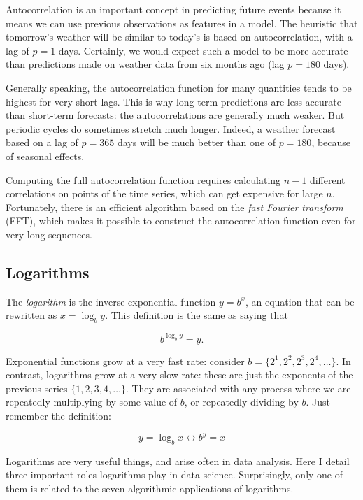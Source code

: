 \documentclass[10pt]{article}
\begin{document}
Autocorrelation is an important concept in predicting future events because it means we can use previous observations as features in a model. The heuristic that tomorrow's weather will be similar to today's is based on autocorrelation, with a lag of $p=1$ days. Certainly, we would expect such a model to be more accurate than predictions made on weather data from six months ago (lag $p=180$ days).

Generally speaking, the autocorrelation function for many quantities tends to be highest for very short lags. This is why long-term predictions are less accurate than short-term forecasts: the autocorrelations are generally much weaker. But periodic cycles do sometimes stretch much longer. Indeed, a weather forecast based on a lag of $p=365$ days will be much better than one of $p=180$, because of seasonal effects.

Computing the full autocorrelation function requires calculating $n-1$ different correlations on points of the time series, which can get expensive for large $n$. Fortunately, there is an efficient algorithm based on the \textit{fast Fourier transform} (FFT), which makes it possible to construct the autocorrelation function even for very long sequences.

\subsection{Logarithms}
The \textit{logarithm} is the inverse exponential function $y=b^{x}$, an equation that can be rewritten as $x=\log_{b} y$. This definition is the same as saying that

\[
b^{\log_{b} y}=y.
\]

Exponential functions grow at a very fast rate: consider $b=\{2^{1}, 2^{2}, 2^{3}, 2^{4}, \ldots\}$. In contrast, logarithms grow at a very slow rate: these are just the exponents of the previous series $\{1,2,3,4,\ldots\}$. They are associated with any process where we are repeatedly multiplying by some value of $b$, or repeatedly dividing by $b$. Just remember the definition:

\[
y=\log_{b} x \longleftrightarrow b^{y}=x
\]

Logarithms are very useful things, and arise often in data analysis. Here I detail three important roles logarithms play in data science. Surprisingly, only one of them is related to the seven algorithmic applications of logarithms.

\end{document}
